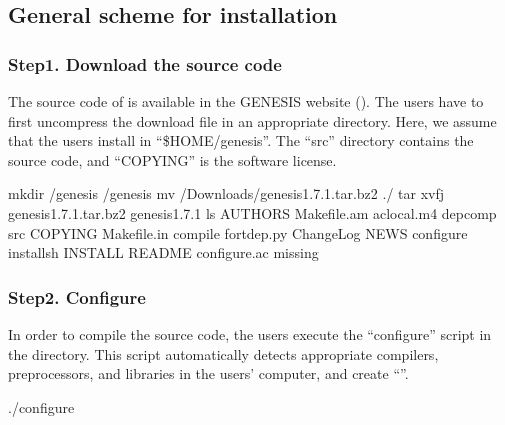 \documentclass[a4paper,11pt,oneside,english]{sphinxmanual}
\begin{document}
\clearpage


\subsection{General scheme for installation}
\label{\detokenize{01_Getting_Started:general-scheme-for-installation}}

\subsubsection{Step1. Download the source code}
\label{\detokenize{01_Getting_Started:step1-download-the-source-code}}
The source code of  is available in the GENESIS website ().
The users have to first uncompress the download file in an appropriate directory.
Here, we assume that the users install  in “\$HOME/genesis”.
The “src” directory contains the source code, and “COPYING” is the software license.

\begin{sphinxVerbatim}[commandchars=\\\{\}]
\PYGZdl{} mkdir /genesis
\PYGZdl{}  /genesis
\PYGZdl{} mv \PYGZti{}/Downloads/genesis\PYGZhy{}1.7.1.tar.bz2 ./
\PYGZdl{} tar xvfj genesis\PYGZhy{}1.7.1.tar.bz2
\PYGZdl{}  genesis\PYGZhy{}1.7.1
\PYGZdl{} ls
AUTHORS      Makefile.am    aclocal.m4      depcomp       src
COPYING      Makefile.in    compile         fortdep.py
ChangeLog    NEWS           configure       install\PYGZhy{}sh
INSTALL      README         configure.ac    missing
\end{sphinxVerbatim}


\subsubsection{Step2. Configure}
\label{\detokenize{01_Getting_Started:step2-configure}}
In order to compile the source code, the users execute the “configure” script in the directory.
This script automatically detects appropriate compilers, preprocessors, and libraries
in the users’ computer, and create “”.

\begin{sphinxVerbatim}[commandchars=\\\{\}]
\PYGZdl{} ./configure
\end{sphinxVerbatim}
\end{document}
